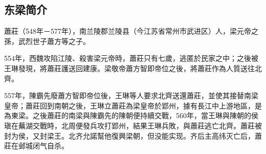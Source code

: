 \subsection{东梁简介}

蕭莊（548年－577年），南兰陵郡兰陵县（今江苏省常州市武进区）人，梁元帝之孫，武烈世子蕭方等之子。

554年，西魏攻陷江陵、殺害梁元帝時，蕭莊只有七歲，逃匿於民家之中；之後被王琳發現，將蕭莊護送回建康。梁敬帝蕭方智即帝位之後，將蕭莊作為人質送往北齊。

557年，陳霸先廢蕭方智即帝位後，王琳等人要求北齊送還蕭莊，並使其接替南梁皇帝；蕭莊回到南朝之後，王琳立蕭莊為梁皇帝於郢州，據有長江中上游地區，是為東梁。之後蕭莊的南梁與陳霸先的陳朝便持續交戰，560年，當王琳與陳朝的侯瑱在蕪湖交戰時，北周便發兵攻打郢州，結果王琳兵敗，與蕭莊逃亡北齊。蕭莊被封为侯，又封梁王。北齐允諾幫他復興梁朝，但没能实现。齐后主高纬灭亡后，蕭莊在邺城闭气自杀。



